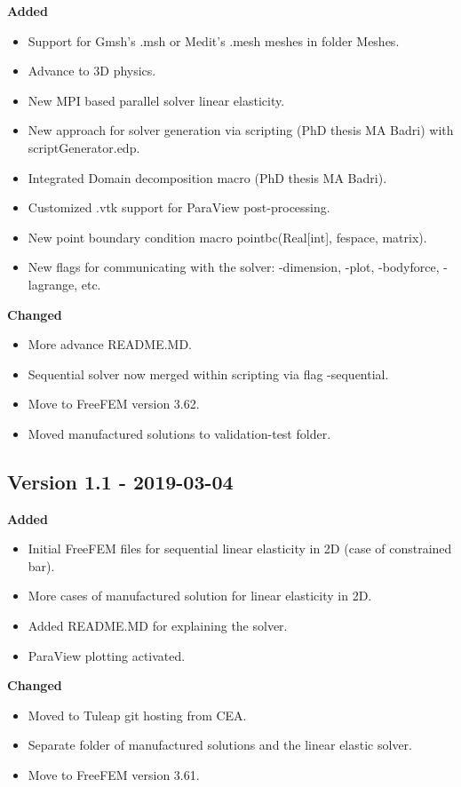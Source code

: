 \documentclass{report}
\begin{document}
\textbf{Added}
\begin{itemize}
\item Support for Gmsh's {\ttfamily .msh}  or Medit's {\ttfamily .mesh} meshes in folder {\ttfamily Meshes}.
\item Advance to 3D physics.
\item New MPI based parallel solver linear elasticity.
\item New approach for solver generation via scripting (PhD thesis MA Badri) with {\ttfamily scriptGenerator.edp}.
\item Integrated Domain decomposition macro (PhD thesis MA Badri).
\item Customized {\ttfamily .vtk} support for ParaView post-processing.
\item New point boundary condition macro {\ttfamily pointbc(Real[int], fespace, matrix)}.
\item New flags for communicating with the solver: {\ttfamily -dimension}, {\ttfamily -plot}, {\ttfamily -bodyforce}, {\ttfamily -lagrange}, etc.
\end{itemize}

\textbf{Changed}
\begin{itemize}
\item More advance README.MD.
\item Sequential solver now merged within scripting via flag {\ttfamily -sequential}.
\item Move to FreeFEM version 3.62.
\item Moved manufactured solutions to {\ttfamily validation-test} folder.
\end{itemize}

\subsection{Version 1.1 - 2019-03-04}

\textbf{Added}
\begin{itemize}
\item Initial FreeFEM files for sequential linear elasticity in 2D (case of constrained bar).
\item More cases of manufactured solution for linear elasticity in 2D.
\item Added {\ttfamily README.MD} for explaining the solver.
\item ParaView plotting activated.
\end{itemize}

\textbf{Changed}
\begin{itemize}
\item Moved to Tuleap git hosting from CEA.
\item Separate folder of manufactured solutions and the linear elastic solver.
\item Move to FreeFEM version 3.61.
\end{itemize}
\end{document}

